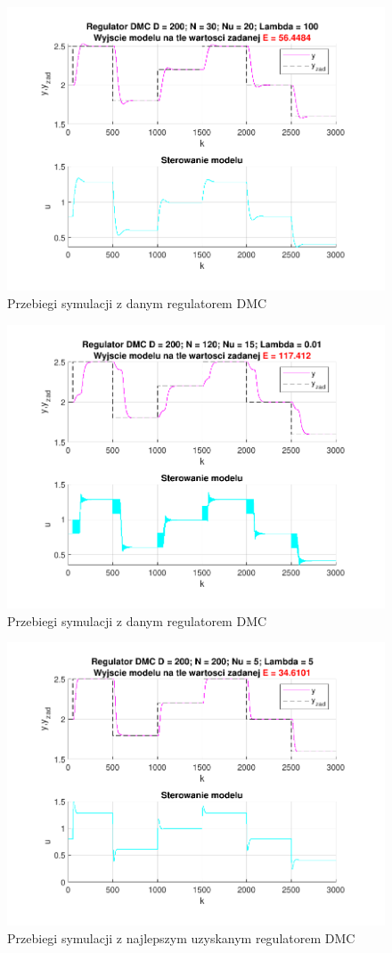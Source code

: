 \begin{figure}[H]
    \centering
    \includegraphics[scale=0.90]{../projekt/zad4_5/DMC_pdf/DMC_2.pdf}
    \caption{Przebiegi symulacji z danym regulatorem DMC}
\end{figure}

\begin{figure}[H]
    \centering
    \includegraphics[scale=0.90]{../projekt/zad4_5/DMC_pdf/DMC_3.pdf}
    \caption{Przebiegi symulacji z danym regulatorem DMC}
\end{figure}

\begin{figure}[H]
    \centering
    \includegraphics[scale=0.90]{../projekt/zad4_5/DMC_pdf/DMC_best.pdf}
    \caption{Przebiegi symulacji z najlepszym uzyskanym regulatorem DMC}
\end{figure}


